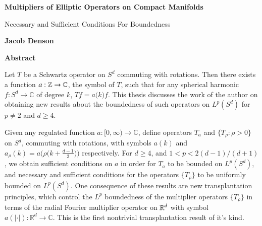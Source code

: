 
\fancyhf{} %
\fancyhead[RO,R]{\thepage} %
\renewcommand{\headrulewidth}{0pt}

\begin{center}
    \Large
    \textbf{Multipliers of Elliptic Operators on Compact Manifolds}
    
    \vspace{0.4cm}
    \large
    Necessary and Sufficient Conditions For Boundedness
    
    \vspace{0.4cm}
    \textbf{Jacob Denson}
    
    \vspace{0.9cm}
    \textbf{Abstract}
\end{center}

Let $T$ be a Schwartz operator on $S^d$ commuting with rotations. Then there exists a function $a: \operatorname{\mathbb{Z}} \to \operatorname{\mathbb{C}}$, the symbol of $T$, such that for any spherical harmonic $f: S^d \to \mathbb{C}$ of degree $k$, $Tf = a \big( k \big) f$. This thesis discusses the work of the author on obtaining new results about the boundedness of such operators on $L^p(S^d)$ for $p \neq 2$ and $d \geq 4$.

Given any regulated function $a: [0,\infty) \to \mathbb{C}$, define operators $T_a$ and $\{ T_\rho : \rho > 0 \}$ on $S^d$, commuting with rotations, with symbols $a(k)$ and $a_\rho(k) = a \big( \rho \big( k + \tfrac{d-1}{2} \big) \big)$ respectively. For $d \geq 4$, and $1 < p < 2(d-1)/(d+1)$, we obtain sufficient conditions on $a$ in order for $T_a$ to be bounded on $L^p(S^d)$, and necessary and sufficient conditions for the operators $\{ T_\rho \}$ to be uniformly bounded on $L^p(S^d)$. One consequence of these results are new transplantation principles, which control the $L^p$ boundedness of the multiplier operators $\{ T_\rho \}$ in terms of the radial Fourier multiplier operator on $\operatorname{\mathbb{R}}^d$ with symbol $a(|\cdot|): \mathbb{R}^d \to \mathbb{C}$. This is the first nontrivial transplantation result of it's kind.


%

